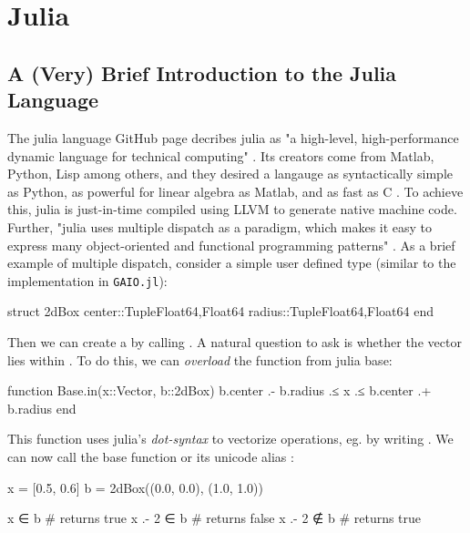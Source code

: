 \section{Julia}


\subsection{A (Very) Brief Introduction to the Julia Language}

The julia language GitHub page decribes julia as "a high-level, high-performance dynamic 
language for technical computing" \cite*{juliarepo}. Its creators come from Matlab, Python,
Lisp among others, and they desired a langauge as syntactically simple as Python, as 
powerful for linear algebra as Matlab, and as fast as C \cite*{julia}. To achieve this,
julia is just-in-time compiled using LLVM to generate native machine code. Further, "julia uses 
multiple dispatch as a paradigm, which makes it easy to express many object-oriented and
functional programming patterns" \cite*{juliamain}. As a brief example of multiple dispatch,
consider a simple user defined type  (similar to the implementation in 
\texttt{GAIO.jl}):

\begin{jllisting}[language=julia, style=jlcodestyle]
    struct 2dBox
        center::Tuple{Float64,Float64}
        radius::Tuple{Float64,Float64}
    end
\end{jllisting}

Then we can create a  by calling . 
A natural question to ask is whether the vector  lies within 
. To do this, we can \emph{overload} the function  from julia base:

\begin{jllisting}[language=julia, style=jlcodestyle]
    function Base.in(x::Vector, b::2dBox)
        b.center .- b.radius .≤ x .≤ b.center .+ b.radius
    end
\end{jllisting}

This function uses julia's \emph{dot-syntax} to vectorize operations, eg. \jlinl{+}
by writing . We can now call the base function  or its unicode alias
:

\begin{jllisting}[language=julia, style=jlcodestyle]
    x = [0.5, 0.6]
    b = 2dBox((0.0, 0.0), (1.0, 1.0))

    x ∈ b           # returns true
    x .- 2 ∈ b      # returns false
    x .- 2 ∉ b      # returns true
\end{jllisting}

